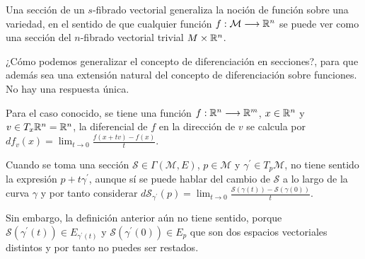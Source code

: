 \begin{summary}

Una sección de un $s$-fibrado vectorial generaliza la noción de función sobre una variedad, en el sentido de
que cualquier
función $f:\mathcal{M}\longrightarrow \mathbb{R}^n$ se puede ver como una sección del $n$-fibrado vectorial trivial $M\times\mathbb{R}^n$.

¿Cómo podemos generalizar el concepto de diferenciación en secciones?, para que además sea una extensión natural del
concepto de diferenciación sobre funciones.
No hay una respuesta única.
\end{summary}

Para el caso conocido, se tiene una función $f:\mathbb{R}^n\longrightarrow \mathbb{R}^m$, $x\in\mathbb{R}^n$ y $v\in T_x \mathbb{R}^n=\mathbb{R}^n$, la diferencial
de $f$ en la dirección de $v$ se calcula por $df_v(x)=\lim_{t\to 0}{\frac {f(x+tv)-f(x)}{t}}$.

Cuando se toma una sección $\mathcal{S}\in\Gamma(\mathcal{M}, E)$, $p\in\mathcal{M}$ y $\gamma^{'}\in T_p \mathcal{M}$, no tiene sentido la
expresión $p+t\gamma^{'}$, aunque sí se puede hablar del cambio de $\mathcal{S}$ a lo largo de la curva $\gamma$
y por tanto considerar $d\mathcal{S}_{\gamma^{'}}(p)=\lim_{t\to 0}\frac{\mathcal{S}(\gamma (t))-\mathcal{S}
(\gamma (0))}{t}$.

Sin embargo, la definición anterior aún no tiene sentido, porque $\mathcal{S}(\gamma^{'}(t))\in
E_{\gamma^{'}(t)}$ y $\mathcal{S}(\gamma^{'}(0))\in E_p$ que son dos espacios vectoriales distintos y
por tanto no puedes ser restados.


